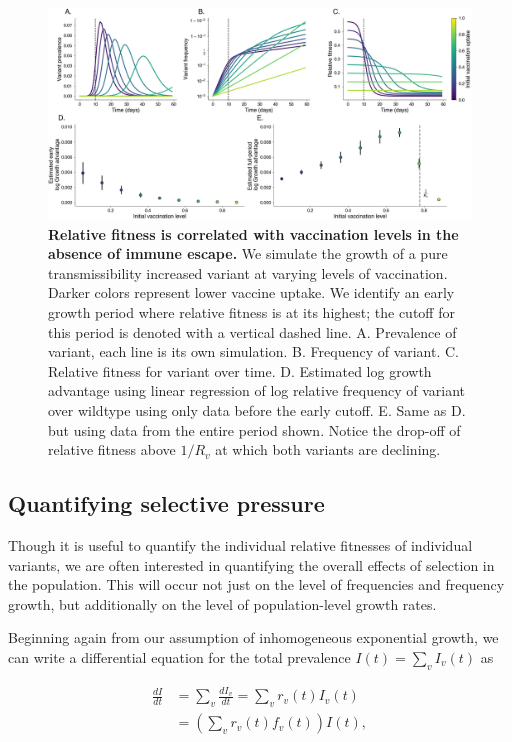 \documentclass[11pt,oneside,letterpaper]{article}
\begin{document}
\begin{figure}[h]
    \centering
    \includegraphics[width=0.8\linewidth]{./figures/correlation_not_mechanism.png}
    \caption{\textbf{Relative fitness is correlated with vaccination levels in the absence of immune escape.}
    We simulate the growth of a pure transmissibility increased variant at varying levels of vaccination.
    Darker colors represent lower vaccine uptake.
    We identify an early growth period where relative fitness is at its highest; the cutoff for this period is denoted with a vertical dashed line.
        A. Prevalence of variant, each line is its own simulation.
        B. Frequency of variant.
        C. Relative fitness for variant over time.
        D. Estimated log growth advantage using linear regression of log relative frequency of variant over wildtype using only data before the early cutoff.
        E. Same as D. but using data from the entire period shown. Notice the drop-off of relative fitness above $1 / R_{v}$ at which both variants are declining.
    }
\label{fig:mechanism_identification}
\end{figure}

\subsection*{Quantifying selective pressure}

Though it is useful to quantify the individual relative fitnesses of individual variants, we are often interested in quantifying the overall effects of selection in the population.
This will occur not just on the level of frequencies and frequency growth, but additionally on the level of population-level growth rates.

Beginning again from our assumption of inhomogeneous exponential growth, we can write a differential equation for the total prevalence $I(t)= \sum_{v} I_{v}(t)$ as

\begin{align*}
    \frac{d I}{d t} &= \sum_{v} \frac{d I_{v}}{d t} =  \sum_{v} r_{v}(t) I_{v}(t)\\
                    &= \left( \sum_{v} r_{v}(t) f_{v}(t) \right) I(t),
\end{align*}
\end{document}
